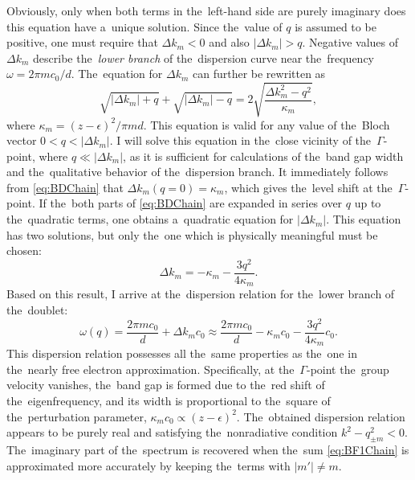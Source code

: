 Obviously, only when both terms in the~left-hand side are purely imaginary does this equation have a~unique solution.
Since the~value of $q$ is assumed to be positive, one must require that $\Delta k_m < 0$ and also $|\Delta k_m| > q$.
Negative values of $\Delta k_m$ describe the~{\it lower branch} of the~dispersion curve near the~frequency $\omega = 2 \pi m c_0/d$.
The~equation for $\Delta k_m$ can further be rewritten as
\begin{equation}
\label{eq:BDChain}
\sqrt{|\Delta k_m| +q} + \sqrt{|\Delta k_m| - q} = 2 \sqrt{\frac{\Delta k_m^2 - q^2}{\kappa_m}},
\end{equation}
where $\kappa_m = (z-\epsilon)^2/\pi m d$.
This equation is valid for any value of the~Bloch vector $0 < q < |\Delta k_m|$.
I will solve this equation in the~close vicinity of the~$\Gamma$-point, where $q \ll |\Delta k_m|$, as it is sufficient for calculations of the~band gap width and the~qualitative behavior of the~dispersion branch.
It immediately follows from \cref{eq:BDChain} that $\Delta k_m(q=0) = \kappa_m$, which gives the~level shift at the~$\Gamma$-point.
If the~both parts of \cref{eq:BDChain} are expanded in series over $q$ up to the~quadratic terms, one obtains a~quadratic equation for $|\Delta k_m|$.
This equation has two solutions, but only the~one which is physically meaningful must be chosen:
\begin{equation}
\label{eq:BEChain}
\Delta k_m= -\kappa_m - \frac{3 q^2}{4 \kappa_m}.
\end{equation}
Based on this result, I arrive at the~dispersion relation for the~lower branch of the~doublet:
\begin{equation}
\label{eq:BFChain}
\omega(q)=\frac{2 \pi m c_0}{d}+ \Delta k_m c_0 \approx \frac{2 \pi m c_0}{d} -\kappa_m c_0 - \frac{3 q^2}{4 \kappa_m} c_0.
\end{equation}
This dispersion relation possesses all the~same properties as the~one in the~nearly free electron approximation.
Specifically, at the~$\Gamma$-point the~group velocity vanishes, the~band gap is formed due to the~red shift of the~eigenfrequency, and its width is proportional to the~square of the~perturbation parameter, $\kappa_m c_0 \propto (z-\epsilon)^2$.
The~obtained dispersion relation appears to be purely real and satisfying the~nonradiative condition $k^2-q_{\pm m}^2 < 0$.
The~imaginary part of the~spectrum is recovered when the~sum \cref{eq:BF1Chain} is approximated more accurately by keeping the~terms with $|m'| \neq m$.



